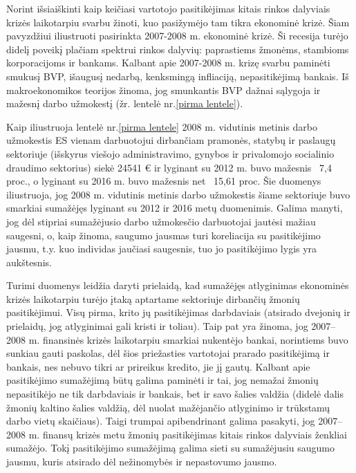 \documentclass[l1pt, titlepage]{article}
\begin{document}
Norint išsiaiškinti kaip keičiasi vartotojo pasitikėjimas kitais rinkos dalyviais krizės laikotarpiu svarbu žinoti, kuo pasižymėjo tam tikra ekonominė krizė. Šiam pavyzdžiui iliustruoti pasirinkta 2007-2008 m. ekonominė krizė. Ši recesija turėjo didelį poveikį plačiam spektrui rinkos dalyvių: paprastiems žmonėms, stambioms korporacijoms ir bankams. Kalbant apie 2007-2008 m. krizę svarbu paminėti smukusį BVP, išaugusį nedarbą, kenksmingą infliaciją, nepasitikėjimą bankais. Iš makroekonomikos teorijos žinoma, jog smunkantis BVP dažnai sąlygoja ir mažesnį darbo užmokestį (žr. lentelė nr.\ref{pirma lentele}).


 Kaip iliustruoja lentelė nr.\ref{pirma lentele} 2008 m. vidutinis metinis darbo užmokestis ES vienam darbuotojui dirbančiam pramonės, statybų ir paslaugų sektoriuje (išskyrus viešojo administravimo, gynybos ir privalomojo socialinio draudimo sektorius) siekė 24541 € ir lyginant su 2012 m. buvo mažesnis ~7,4 proc., o lyginant su 2016 m. buvo mažesnis net ~15,61 proc. Šie duomenys iliustruoja, jog 2008 m. vidutinis metinis darbo užmokestis šiame sektoriuje buvo smarkiai sumažėjęs lyginant su 2012 ir 2016 metų duomenimis. Galima manyti, jog dėl stipriai sumažėjusio darbo užmokesčio darbuotojai jautėsi mažiau saugesni, o, kaip žinoma, saugumo jausmas turi koreliacija su pasitikėjimo jausmu, t.y. kuo individas jaučiasi saugesnis, tuo jo pasitikėjimo lygis yra aukštesnis. 
 
Turimi duomenys leidžia daryti prielaidą, kad sumažėjęs atlyginimas ekonominės krizės laikotarpiu turėjo įtaką aptartame sektoriuje dirbančių žmonių pasitikėjimui. Visų pirma, krito jų pasitikėjimas darbdaviais (atsirado dvejonių ir prielaidų, jog atlyginimai gali kristi ir toliau). Taip pat yra žinoma, jog 2007–2008 m. finansinės krizės laikotarpiu smarkiai nukentėjo bankai, norintiems buvo sunkiau gauti paskolas, dėl šios priežasties vartotojai prarado pasitikėjimą ir bankais, nes nebuvo tikri ar prireikus kredito, jie jį gautų. Kalbant apie pasitikėjimo sumažėjimą būtų galima paminėti ir tai, jog nemažai žmonių nepasitikėjo ne tik darbdaviais ir bankais, bet ir savo šalies valdžia (didelė dalis žmonių kaltino šalies valdžią, dėl nuolat mažėjančio atlyginimo ir trūkstamų darbo vietų skaičiaus).  Taigi trumpai apibendrinant galima pasakyti, jog 2007–2008 m. finansų krizės metu  žmonių pasitikėjimas kitais rinkos dalyviais ženkliai sumažėjo. Tokį pasitikėjimo sumažėjimą galima sieti su sumažėjusiu saugumo jausmu, kuris atsirado dėl nežinomybės ir nepastovumo jausmo.
\end{document}
